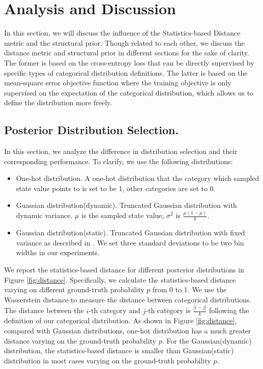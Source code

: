 \section{Analysis and Discussion}
In this section, we will discuss the influence of the Statistics-based Distance metric and the structural prior. Though related to each other, we discuss the distance metric and structural prior in different sections for the sake of clarity. The former is based on the cross-entropy loss that can be directly supervised by specific types of categorical distribution definitions. The latter is based on the mean-square error objective function where the training objective is only supervised on the expectation of the categorical distribution, which allows us to define the distribution more freely.
\subsection{Posterior Distribution Selection.}\label{analysis_sampling}

In this section, we analyze the difference in distribution selection and their corresponding performance. To clarify, we use the following distributions:
\begin{itemize}
    \item One-hot distribution. A one-hot distribution that the category which sampled state value points to is set to be 1, other categories are set to 0.
    \item Guassian distribution(dynamic). Truncated Gaussian distribution with dynamic variance. $\mu$ is the sampled state value, $\sigma^2$ is $\frac{\mu(1-\mu)}{k}$.
    \item Gaussian distribution(static). Truncated Gaussian distribution with fixed variance as described in \citet{DBLP:conf/icml/FarebrotherOVTC24}. We set three standard deviations to be two bin widths in our experiments.
\end{itemize}
We report the statistics-based distance for different posterior distributions in Figure \ref{fig:distance}. Specifically, we calculate the statistics-based distance varying on different ground-truth probability $p$ from 0 to 1. We use the Wasserstein distance to measure the distance between categorical distributions. The distance between the $i$-th category and $j$-th category is $\frac{|i-j|}{k}$ following the definition of our categorical distribution. As shown in Figure \ref{fig:distance}, compared with Gaussian distributions, one-hot distribution has a much greater distance varying on the ground-truth probability $p$. For the Gaussian(dynamic) distribution, the statistics-based distance is smaller than Gaussian(static) distribution in most cases varying on the ground-truth probability $p$.

